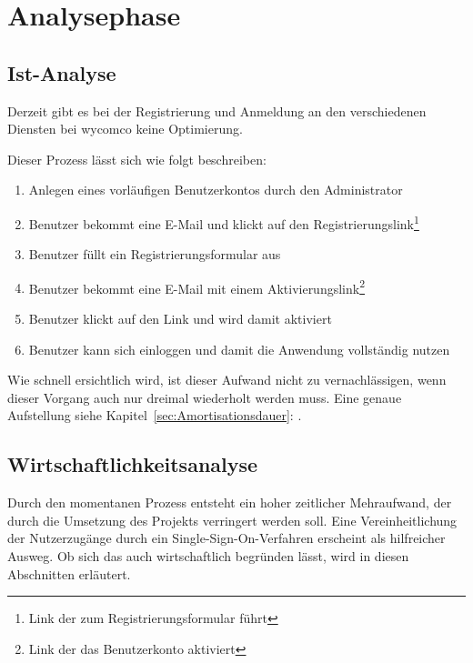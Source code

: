 \section{Analysephase} 
\label{sec:Analysephase}


\subsection{Ist-Analyse} 
\label{sec:IstAnalyse}

Derzeit gibt es bei der Registrierung und Anmeldung an den verschiedenen Diensten bei wycomco keine Optimierung. 

Dieser Prozess lässt sich wie folgt beschreiben:
\begin{enumerate}
	\item Anlegen eines vorläufigen Benutzerkontos durch den Administrator
	\item Benutzer bekommt eine E-Mail und klickt auf den Registrierungslink\footnote{Link der zum Registrierungsformular führt}
	\item Benutzer füllt ein Registrierungsformular aus
	\item Benutzer bekommt eine E-Mail mit einem Aktivierungslink\footnote{Link der das Benutzerkonto aktiviert}
	\item Benutzer klickt auf den Link und wird damit aktiviert
	\item Benutzer kann sich einloggen und damit die Anwendung vollständig nutzen
\end{enumerate}

Wie schnell ersichtlich wird, ist dieser Aufwand nicht zu vernachlässigen, wenn dieser Vorgang auch nur dreimal wiederholt werden muss. Eine genaue Aufstellung siehe Kapitel~\ref{sec:Amortisationsdauer}: .

\subsection{Wirtschaftlichkeitsanalyse}
\label{sec:Wirtschaftlichkeitsanalyse}

Durch den momentanen Prozess entsteht ein hoher zeitlicher Mehraufwand, der durch die Umsetzung des Projekts verringert werden soll.
Eine Vereinheitlichung der Nutzerzugänge durch ein Single-Sign-On-Verfahren erscheint als hilfreicher Ausweg.
Ob sich das auch wirtschaftlich begründen lässt, wird in diesen Abschnitten erläutert.

